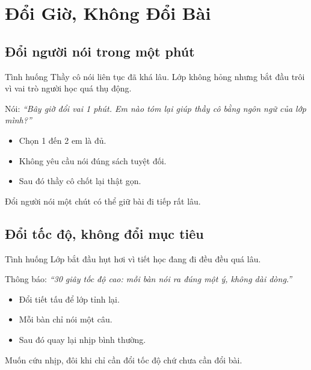 \chapter{Đổi Giờ, Không Đổi Bài}

\section{Đổi người nói trong một phút}
\begin{tinhhuong}{Tình huống}
Thầy cô nói liên tục đã khá lâu. Lớp không hỏng nhưng bắt đầu trôi vì vai trò người học quá thụ động.
\end{tinhhuong}
\begin{goiydungngay}
Nói: \textit{``Bây giờ đổi vai 1 phút. Em nào tóm lại giúp thầy cô bằng ngôn ngữ của lớp mình?''}
\begin{itemize}
\item Chọn 1 đến 2 em là đủ.
\item Không yêu cầu nói đúng sách tuyệt đối.
\item Sau đó thầy cô chốt lại thật gọn.
\end{itemize}
\end{goiydungngay}
\begin{cauchot}
Đổi người nói một chút có thể giữ bài đi tiếp rất lâu.
\end{cauchot}
\ngancach

\section{Đổi tốc độ, không đổi mục tiêu}
\begin{tinhhuong}{Tình huống}
Lớp bắt đầu hụt hơi vì tiết học đang đi đều đều quá lâu.
\end{tinhhuong}
\begin{goiydungngay}
Thông báo: \textit{``30 giây tốc độ cao: mỗi bàn nói ra đúng một ý, không dài dòng.''}
\begin{itemize}
\item Đổi tiết tấu để lớp tỉnh lại.
\item Mỗi bàn chỉ nói một câu.
\item Sau đó quay lại nhịp bình thường.
\end{itemize}
\end{goiydungngay}
\begin{cauchot}
Muốn cứu nhịp, đôi khi chỉ cần đổi tốc độ chứ chưa cần đổi bài.
\end{cauchot}
\ngancach

